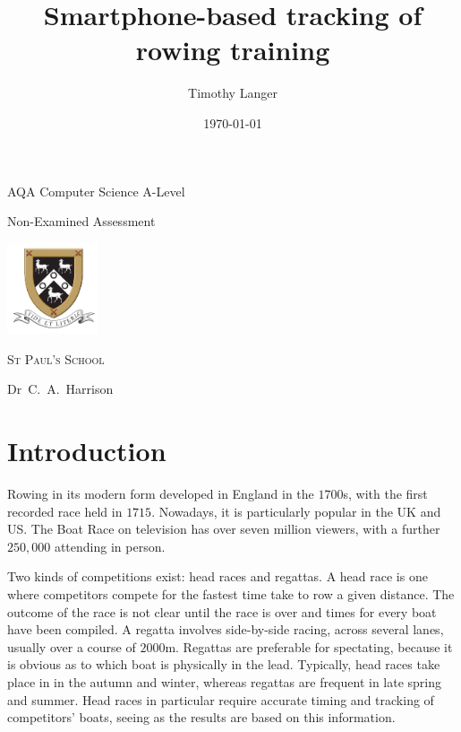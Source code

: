 \documentclass[11pt,twoside,a4paper]{report}
\author{Timothy Langer}
\title{Smartphone-based tracking of rowing training}
\date{\today}
\begin{document}
\begin{titlepage}
  \centering
  \vspace*{1cm}
  {\bfseries \huge \@title \par}
  \vspace{2cm}
  {\large AQA Computer Science A-Level \par Non-Examined Assessment \par}
  \vspace{1.5cm}
  {\LARGE \@author \par}
  \vfill
  \includegraphics[width=0.2\textwidth]{sps-logo} \par
  {\scshape\LARGE St Paul's School \par}
  Dr~C.~A.~Harrison \par
  \vspace{1cm}
  {\large \@date \par}
  \vspace*{1cm}
\end{titlepage}

\makeatother

\tableofcontents

\chapter{Introduction}

Rowing in its modern form developed in England in the $1700$s, with the first recorded race held in $1715$. 
Nowadays, it is particularly popular in the UK and US. 
The Boat Race on television has over seven million viewers, with a further $250,000$ attending in person.\cite{the_boat_race} 

Two kinds of competitions exist: head races and regattas. 
A head race is one where competitors compete for the fastest time take to row a given distance. 
The outcome of the race is not clear until the race is over and times for every boat have been compiled.
A regatta involves side-by-side racing, across several lanes, usually over a course of $2000 \si{\meter}$.
Regattas are preferable for spectating, because it is obvious as to which boat is physically in the lead.
Typically, head races take place in in the autumn and winter, whereas regattas are frequent in late spring and summer.
Head races in particular require accurate timing and tracking of competitors' boats, seeing as the results are based on this information.
\end{document}
